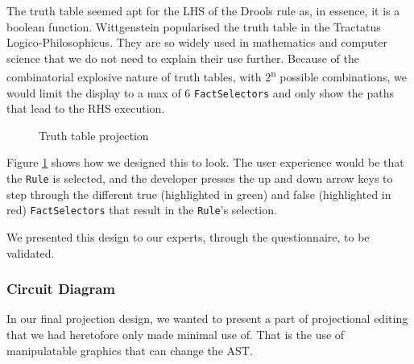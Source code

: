 The truth table seemed apt for the LHS of the Drools rule as, in essence, it is a boolean function.
Wittgenstein popularised the truth table in the Tractatus Logico-Philosophicus\cite{wittgenstein2013tractatus}.
They are so widely used in mathematics and computer science that we do not need to explain their use further.
Because of the combinatorial explosive nature of truth tables, with 2\textsuperscript{n} possible combinations, we would limit the display to a max of 6 \texttt{FactSelectors} and only show the paths that lead to the RHS execution.

\begin{figure}[h]
    \centering
    \caption{Truth table projection}
    \label{fig:TruthTableProjection}
\end{figure}

Figure \ref{fig:TruthTableProjection} shows how we designed this to look.
The user experience would be that the \texttt{Rule} is selected, and the developer presses the up and down arrow keys to step through the different true (highlighted in green) and false (highlighted in red) \texttt{FactSelectors} that result in the \texttt{Rule}'s selection.

We presented this design to our experts, through the questionnaire, to be validated.

\subsubsection{Circuit Diagram}
In our final projection design, we wanted to present a part of projectional editing that we had heretofore only made minimal use of.
That is the use of manipulatable graphics that can change the AST.

